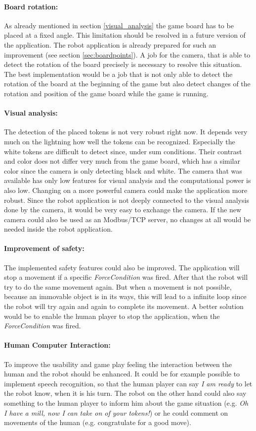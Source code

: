 \documentclass[a4paper]{spie}  %
\begin{document}
\begin{large}
\paragraph{Board rotation:} As already mentioned in section \ref{visual_analysis} the game board has to be placed at a fixed angle. This limitation should be resolved in a future version of the application. The robot application is already prepared for such an improvement (see section \ref{sec:boardpoints}). A job for the camera, that is able to detect the rotation of the board precisely is necessary to resolve this situation. The best implementation would be a job that is not only able to detect the rotation of the board at the beginning of the game but also detect changes of the rotation and position of the game board while the game is running.   
\paragraph{Visual analysis:} The detection of the placed tokens is not very robust right now. It depends very much on the lightning how well the tokens can be recognized. Especially the white tokens are difficult to detect since, under sum conditions. Their contrast and color does not differ very much from the game board, which has a similar color since the camera is only detecting black and white. The camera that was available has only low features for visual analysis and the computational power is also low. Changing on a more powerful camera could make the application more robust. Since the robot application is not deeply connected to the visual analysis done by the camera, it would be very easy to exchange the camera. If the new camera could also be used as an Modbus/TCP server, no changes at all would be needed inside the robot application. 
\paragraph{Improvement of safety:} The implemented safety features could also be improved. The application will stop a movement if a specific \emph{ForceCondition} was fired. After that the robot will try to do the same movement again. But when a movement is not possible, because an immovable object is in its ways, this will lead to a infinite loop since the robot will try again and again to complete its movement. A better solution would be to enable the human player to stop the application, when the \emph{ForceCondition} was fired.
\paragraph{Human Computer Interaction:} To improve the usability and game play feeling the interaction between the human and the robot should be enhanced. It could be for example possible to implement speech recognition, so that the human player can say \emph{I am ready} to let the robot know, when it is his turn. The robot on the other hand could also say something to the human player to inform him about the game situation (e.g. \emph{Oh I have a mill, now I can take on of your tokens!}) or he could comment on movements of the human (e.g. congratulate for a good move).
\newpage


\end{large}
\end{document}
